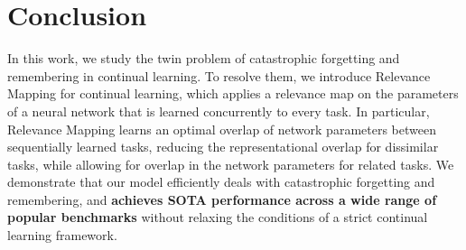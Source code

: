 \documentclass{article}
\begin{document}
\section{Conclusion}

In this work, we study the twin problem of catastrophic forgetting and remembering in continual learning.
To resolve them, we introduce Relevance Mapping for continual learning, which applies a relevance map on the parameters of a neural network that is learned concurrently to every task. In particular, Relevance Mapping learns an optimal overlap of network parameters between sequentially learned tasks, reducing the representational overlap for dissimilar tasks, while allowing for overlap in the network parameters for related tasks.
We demonstrate that our model efficiently deals with catastrophic forgetting and remembering, and \textbf{achieves SOTA performance across a wide range of popular benchmarks} without relaxing the conditions of a strict continual learning framework.
\nocite{sri14, ando05, ebrahimi_uncertainty-guided_2020-1,oswald_continual_2019, ahn_uncertainty-based_nodate, kurle_continual_2020, knoblauch_optimal_2020, kri, Lake1332, 10027939599}
\newpage


\end{document}
